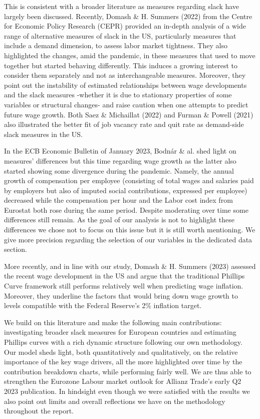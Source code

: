 This is consistent with a broader literature as measures regarding slack have largely been discussed. 
Recently, Domash \& H. Summers (2022)\cite{labour4} from the Centre for Economic Policy Research (CEPR) provided an in-depth analysis of a wide range of alternative measures of slack in the US, particularly measures that include a demand dimension, to assess labor market tightness. 
They also highlighted the changes, amid the pandemic, in these measures that used to move together but started behaving differently. 
This induces a growing interest to consider them separately and not as interchangeable measures. 
Moreover, they point out the instability of estimated relationships between wage developments and the slack measures -whether it is due to stationary properties of some variables or structural changes- and raise caution when one attempts to predict future wage growth. 
Both Saez \& Michaillat (2022)\cite{labour5} and Furman \& Powell (2021)\cite{labour6} also illustrated the better fit of job vacancy rate and quit rate as demand-side slack measures in the US.

In the ECB Economic Bulletin of January 2023, Bodnár \& al.\cite{labour7} shed light on measures’ differences but this time regarding wage growth as the latter also started showing some divergence during the pandemic. 
Namely, the annual growth of compensation per employee (consisting of total wages and salaries paid by employers but also of imputed social contributions, expressed per employee) decreased while the compensation per hour and the Labor cost index from Eurostat both rose during the same period. 
Despite moderating over time some differences still remain. 
As the goal of our analysis is not to highlight these differences we chose not to focus on this issue but it is still worth mentioning. 
We give more precision regarding the selection of our variables in the dedicated data section.

More recently, and in line with our study, Domash \& H. Summers (2023)\cite{labour8} assessed the recent wage development in the US and argue that the traditional Phillips Curve framework still performs relatively well when predicting wage inflation. 
Moreover, they underline the factors that would bring down wage growth to levels compatible with the Federal Reserve’s 2\% inflation target.

We build on this literature and make the following main contributions: investigating broader slack measures for European countries and estimating Phillips curves with a rich dynamic structure following our own methodology. 
Our model sheds light, both quantitatively and qualitatively, on the relative importance of the key wage drivers, all the more highlighted over time by the contribution breakdown charts, while performing fairly well. 
We are thus able to strengthen the Eurozone Labour market outlook for Allianz Trade’s early Q2 2023 publication.
In hindsight even though we were satisfied with the results we also point out limits and overall reflections we have on the methodology throughout the report.
